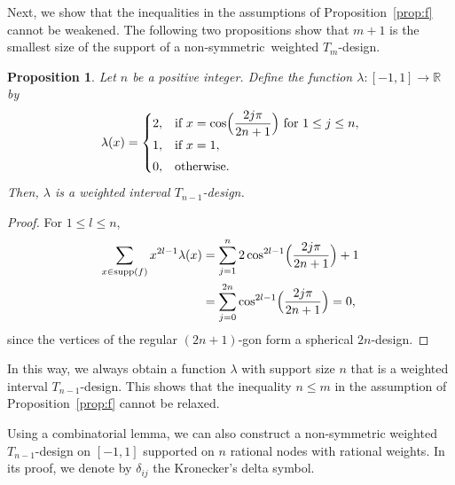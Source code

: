 \documentclass[11pt]{amsart}
\newtheorem{prop}[thm]{Proposition}
\theoremstyle{definition}
\DeclareMathOperator{\supp}{supp}
\newcommand{\R}{\mathbb{R}}
\newcommand{\nantipodal}{non-symmetric}
\begin{document}
{Next, we show that the inequalities in the assumptions of
Proposition~\ref{prop:f} cannot be weakened.}
The following {two} propositions {show} that $m+1$ is the smallest size of the support
of a \nantipodal\ weighted $T_m$-design. 

\begin{prop}\label{prop:f_opt+}
Let {$n$} be a positive integer.
Define the function $\lambda\colon[-1,1]\to\R$ by
\[
\lambda(x)=
\begin{cases}
2, & \text{if } x = \cos\Bigl(\dfrac{2j\pi}{2{n}+1}\Bigr) \text{ for } 1\le j\le {n}, \\[1mm]
1, & \text{if } x = 1, \\[1mm]
0, & \text{otherwise.}
\end{cases}
\]
Then, $\lambda$ is a weighted interval $T_{{n}-1}$-design.

 
\end{prop}

\begin{proof}
For $1\le l \le n$,
\begin{align*}
\sum_{x\in\supp(f)} x^{2l-1}\lambda(x) 
&= \sum_{j=1}^{n} 2\cos^{2l-1}\Bigl(\frac{2j\pi}{2n+1}\Bigr)+ 1    \\
&= \sum_{j=0}^{2n}\cos^{2l-1}\Bigl(\frac{2j\pi}{2n+1}\Bigr)=0,
\end{align*}
since the vertices of the regular $(2n+1)$-gon form a spherical $2n$-design.
\end{proof}

In this way, we always obtain a function \( \lambda \) with support size \( n \) that is a weighted interval \( T_{n-1} \)-design. This shows that the inequality \( n\leq m \) in the assumption of Proposition~\ref{prop:f} cannot be relaxed. 

Using a combinatorial lemma, we can also construct a non-symmetric weighted \(T_{n-1}\)-design on \([-1,1]\) supported on \(n\) rational nodes with rational weights. In its proof, we
denote by \( \delta_{ij} \) the Kronecker's delta symbol.
\end{document}
